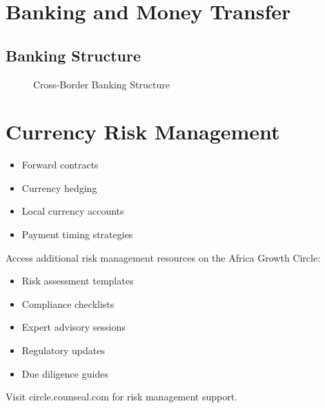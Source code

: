\FloatBarrier
\section{Banking and Money Transfer}

\subsection{Banking Structure}
\begin{figure}[htbp]
    \centering
    \caption{Cross-Border Banking Structure}
    \label{fig:banking-structure}
\end{figure}

\FloatBarrier
\section{Currency Risk Management}

\begin{tcolorbox}[colback=white,colframe=primarydark,title=\textbf{Currency Risk Mitigation Strategies}]
\begin{itemize}
    \item Forward contracts
    \item Currency hedging
    \item Local currency accounts
    \item Payment timing strategies
\end{itemize}
\end{tcolorbox}

\begin{communitybox}
Access additional risk management resources on the Africa Growth Circle:
\begin{itemize}
    \item Risk assessment templates
    \item Compliance checklists
    \item Expert advisory sessions
    \item Regulatory updates
    \item Due diligence guides
\end{itemize}
Visit circle.counseal.com for risk management support.
\end{communitybox}

